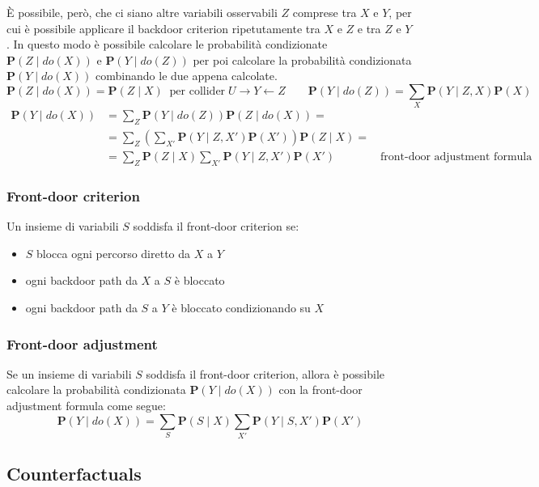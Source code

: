 È possibile, però, che ci siano altre variabili osservabili \(Z\) comprese tra \(X\) e \(Y\), per cui è possibile applicare
il backdoor criterion ripetutamente tra \(X\) e \(Z\) e tra \(Z\) e \(Y\). In questo modo è possibile calcolare le probabilità
condizionate \(\textbf{P}(Z \mid do(X))\) e \(\textbf{P}(Y \mid do(Z))\) per poi calcolare la probabilità condizionata
\(\textbf{P}(Y \mid do(X))\) combinando le due appena calcolate.
\[\textbf{P}(Z \mid do(X)) = \textbf{P}(Z \mid X) \;\; \text{per collider} \; U \to Y \leftarrow Z\qquad \textbf{P}(Y \mid do(Z)) = \sum_{X} \textbf{P}(Y \mid Z, X) \textbf{P}(X)\]
\begin{align*}
	\textbf{P}(Y \mid do(X)) &= \sum_{Z} \textbf{P}(Y \mid do(Z)) \textbf{P}(Z \mid do(X)) = \\
	&= \sum_{Z} \left( \sum_{X'} \textbf{P}(Y \mid Z, X') \textbf{P}(X') \right) \textbf{P}(Z \mid X) = \\
	&= \sum_{Z} \textbf{P}(Z \mid X) \sum_{X'} \textbf{P}(Y \mid Z, X') \textbf{P}(X') \qquad\qquad \text{front-door adjustment formula}
\end{align*}

\subsubsection*{Front-door criterion}
Un insieme di variabili \(S\) soddisfa il front-door criterion se:
\begin{itemize}
	\item \(S\) blocca ogni percorso diretto da \(X\) a \(Y\)
	\item ogni backdoor path da \(X\) a \(S\) è bloccato
	\item ogni backdoor path da \(S\) a \(Y\) è bloccato condizionando su \(X\)
\end{itemize}

\subsubsection*{Front-door adjustment}
Se un insieme di variabili \(S\) soddisfa il front-door criterion, allora è possibile calcolare la probabilità condizionata
\(\textbf{P}(Y \mid do(X))\) con la front-door adjustment formula come segue:
\[\textbf{P}(Y \mid do(X)) = \sum_{S} \textbf{P}(S \mid X) \sum_{X'} \textbf{P}(Y \mid S, X') \textbf{P}(X')\]

\newpage

\subsection{Counterfactuals}
